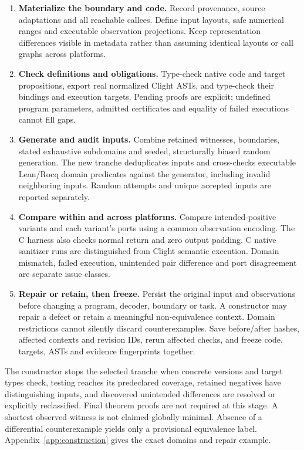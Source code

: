 \documentclass{article}
\begin{document}
\begin{enumerate}
\item \textbf{Materialize the boundary and code.} Record provenance, source adaptations and all reachable callees. Define input layouts, safe numerical ranges and executable observation projections. Keep representation differences visible in metadata rather than assuming identical layouts or call graphs across platforms.
\item \textbf{Check definitions and obligations.} Type-check native code and target propositions, export real normalized Clight ASTs, and type-check their bindings and execution targets. Pending proofs are explicit; undefined program parameters, admitted certificates and equality of failed executions cannot fill gaps.
\item \textbf{Generate and audit inputs.} Combine retained witnesses, boundaries, stated exhaustive subdomains and seeded, structurally biased random generation. The new tranche deduplicates inputs and cross-checks executable Lean/Rocq domain predicates against the generator, including invalid neighboring inputs. Random attempts and unique accepted inputs are reported separately.
\item \textbf{Compare within and across platforms.} Compare intended-positive variants and each variant's ports using a common observation encoding. The C harness also checks normal return and zero output padding. C native sanitizer runs are distinguished from Clight semantic execution. Domain mismatch, failed execution, unintended pair difference and port disagreement are separate issue classes.
\item \textbf{Repair or retain, then freeze.} Persist the original input and observations before changing a program, decoder, boundary or task. A constructor may repair a defect or retain a meaningful non-equivalence context. Domain restrictions cannot silently discard counterexamples. Save before/after hashes, affected contexts and revision IDs, rerun affected checks, and freeze code, targets, ASTs and evidence fingerprints together.
\end{enumerate}

The constructor stops the selected tranche when concrete versions and target types check, testing reaches its predeclared coverage, retained negatives have distinguishing inputs, and discovered unintended differences are resolved or explicitly reclassified. Final theorem proofs are not required at this stage. A shortest observed witness is not claimed globally minimal. Absence of a differential counterexample yields only a provisional equivalence label. Appendix~\ref{app:construction} gives the exact domains and repair example.
\end{document}
